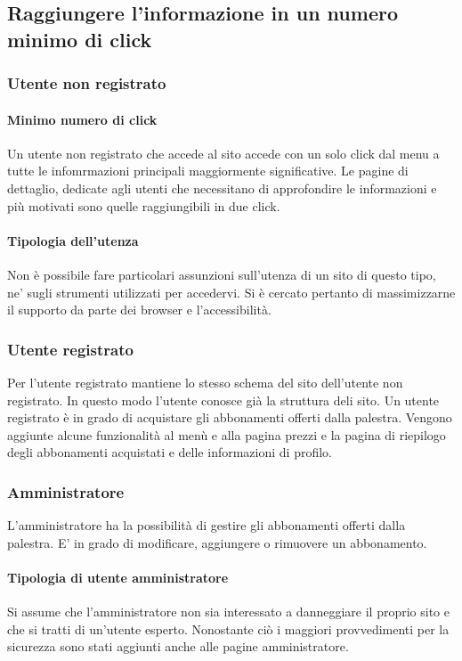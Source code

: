 \documentclass[12pt,a4paper]{article}
\begin{document}
\subsection{Raggiungere l'informazione in un numero minimo di click}
\subsubsection{Utente non registrato}
\paragraph{Minimo numero di click}Un utente non registrato che accede al sito accede con un solo click dal menu a tutte le infomrmazioni principali maggiormente significative.
Le pagine di dettaglio, dedicate agli utenti che necessitano di approfondire le informazioni e più motivati sono quelle raggiungibili in due click. 
\paragraph{Tipologia dell'utenza}Non è possibile fare particolari assunzioni sull'utenza di un sito di questo tipo, ne' sugli strumenti utilizzati per accedervi. Si è cercato pertanto di massimizzarne il supporto da parte dei browser e l'accessibilità.
\subsubsection{Utente registrato} Per l'utente registrato mantiene lo stesso schema del sito dell'utente non registrato. In questo modo l'utente conosce già la struttura deli sito. Un utente registrato è in grado di acquistare gli abbonamenti offerti dalla palestra.
Vengono aggiunte alcune funzionalità al menù e alla pagina prezzi e la pagina di riepilogo degli abbonamenti acquistati e delle informazioni di profilo.
\subsubsection{Amministratore} L'amministratore ha la possibilità di gestire gli abbonamenti offerti dalla palestra. E' in grado di modificare, aggiungere o rimuovere un abbonamento. 
\paragraph{Tipologia di utente amministratore}Si assume che l'amministratore non sia interessato a danneggiare il proprio sito e che si tratti di un'utente esperto. Nonostante ciò i maggiori provvedimenti per la sicurezza sono stati aggiunti anche alle pagine amministratore.
\end{document}

